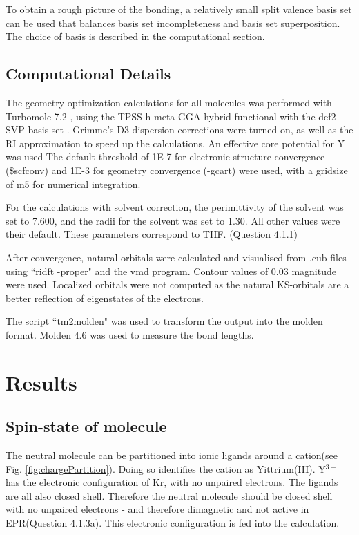 \documentclass[11pt]{article}
\begin{document}
To obtain a rough picture of the bonding, a relatively small split
valence basis set can be used that balances basis set
incompleteness and basis set superposition. The choice of basis
is described in the computational section.


\subsection{Computational Details}

The geometry optimization calculations for all molecules was
performed with {\sc Turbomole} 7.2\cite{TURBOMOLE} , 
using the TPSS-h meta-GGA hybrid
functional\cite{Tao.J:PRL.2003}
with the def2-SVP basis set \cite{Weigend.F:PCCP.2005}. 
Grimme's D3 dispersion corrections
\cite{JCC:JCC20495,doi:10.1063/1.3382344}
were turned on, as well as the RI approximation to speed up the
calculations. An effective core potential for Y was used
\cite{Andrae.D:TCA.1990}
The default threshold of
1E-7 for electronic structure convergence (\$scfconv) and 1E-3
for geometry convergence (-gcart) were used, with a gridsize of m5 
for numerical integration.\cite{Treutler95a}

For the calculations with solvent correction, the perimittivity
of the solvent was set to 7.600, and the radii for the solvent
was set to 1.30.\cite{COSMO}  All other values were their default. These
parameters correspond to THF. (Question 4.1.1)

After convergence, natural orbitals were
calculated and visualised from .cub files using ``ridft -proper"
and the vmd program. Contour values of 0.03 magnitude were used.
Localized orbitals were not computed as the natural KS-orbitals are
a better reflection of eigenstates of the electrons.

The script ``tm2molden" was used to transform the output into the
molden format. Molden 4.6 was used to measure the bond lengths.

\section{Results}

\subsection{Spin-state of molecule}

The neutral molecule can be partitioned into ionic ligands
around a cation(see Fig. \ref{fig:chargePartition}). 
Doing so identifies the cation as
Yittrium(III). Y$^{3+}$ has the electronic configuration of Kr,
with no unpaired electrons. The ligands are all also closed
shell. Therefore the neutral molecule should be closed shell
with no unpaired electrons - and therefore dimagnetic and not
active in EPR(Question 4.1.3a). 
This electronic configuration is fed into the
calculation.
\end{document}
